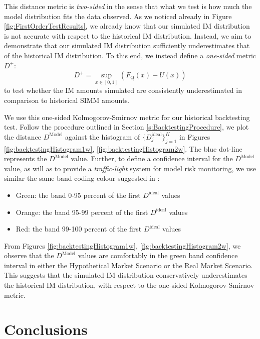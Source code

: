\documentclass[preprint,12pt]{elsarticle}
\begin{document}
This distance metric is \emph{two-sided} in the sense that what we test is how much the model distribution fits the data observed. As we noticed already in Figure \ref{fig:FirstOrderTestResults}, we already know that our simulated IM distribution is not accurate with respect to the historical IM distribution. Instead, we aim to demonstrate that our simulated IM distribution sufficiently underestimates that of the historical IM distribution. To this end, we instead define a \emph{one-sided} metric $D^{+}$:
\begin{equation}
D^+=\sup_{x \in [0,1]}(F_{\textrm{Q}}(x)-U(x))
\end{equation}
to test whether the IM amounts simulated are consistently underestimated in comparison to historical SIMM amounts.  

We use this one-sided Kolmogorov-Smirnov metric for our historical backtesting test. Follow the procedure outlined in Section \ref{s:BacktestingProcedure}, we plot the distance $D^{\textrm{Model}}$ against the histogram of $\{D^{\textrm{ideal}}_j\}_{j=1}^K$ in Figures \ref{fig:backtestingHistogram1w}, \ref{fig:backtestingHistogram2w}. The blue dot-line represents the $D^{\textrm{Model}}$ value. Further, to define a confidence interval for the $D^{\textrm{Model}}$ value, as will as to provide a \emph{traffic-light} system for model risk monitoring, we use similar the same band coding colour suggested in \cite{ruiz2014backtesting}:

\begin{itemize}
\item Green: the band 0-95 percent of the first $D^{\textrm{ideal}}$ values
\item Orange: the band 95-99 percent of the first $D^{\textrm{ideal}}$ values
\item Red: the band 99-100 percent of the first $D^{\textrm{ideal}}$ values
\end{itemize}

From Figures \ref{fig:backtestingHistogram1w}, \ref{fig:backtestingHistogram2w}, we observe that the $D^{\textrm{Model}}$ values are comfortably in the green band confidence interval in either the Hypothetical Market Scenario or the Real Market Scenario. This suggests that the simulated IM distribution conservatively underestimates the historical IM distribution, with respect to the one-sided Kolmogorov-Smirnov metric. 

\section{Conclusions} \label{sec:conclusion}
\end{document}
